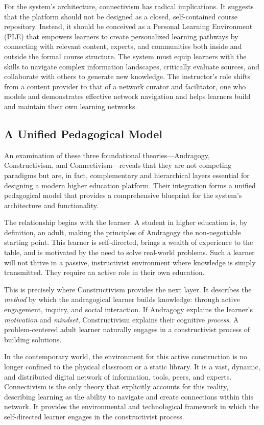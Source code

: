 \documentclass{article}
\begin{document}
For the system's architecture, connectivism has radical implications. It suggests that the platform should not be designed as a closed, self-contained course repository. Instead, it should be conceived as a Personal Learning Environment (PLE) that empowers learners to create personalized learning pathways by connecting with relevant content, experts, and communities both inside and outside the formal course structure.\cite{22} The system must equip learners with the skills to navigate complex information landscapes, critically evaluate sources, and collaborate with others to generate new knowledge.\cite{22} The instructor's role shifts from a content provider to that of a network curator and facilitator, one who models and demonstrates effective network navigation and helps learners build and maintain their own learning networks.\cite{18, 19}

\subsection{A Unified Pedagogical Model}

An examination of these three foundational theories—Andragogy, Constructivism, and Connectivism—reveals that they are not competing paradigms but are, in fact, complementary and hierarchical layers essential for designing a modern higher education platform. Their integration forms a unified pedagogical model that provides a comprehensive blueprint for the system's architecture and functionality.

The relationship begins with the learner. A student in higher education is, by definition, an adult, making the principles of Andragogy the non-negotiable starting point.\cite{7, 8} This learner is self-directed, brings a wealth of experience to the table, and is motivated by the need to solve real-world problems. Such a learner will not thrive in a passive, instructivist environment where knowledge is simply transmitted. They require an active role in their own education.

This is precisely where Constructivism provides the next layer. It describes the \textit{method} by which the andragogical learner builds knowledge: through active engagement, inquiry, and social interaction.\cite{12, 14} If Andragogy explains the learner's \textit{motivation} and \textit{mindset}, Constructivism explains their cognitive \textit{process}. A problem-centered adult learner naturally engages in a constructivist process of building solutions.

In the contemporary world, the environment for this active construction is no longer confined to the physical classroom or a static library. It is a vast, dynamic, and distributed digital network of information, tools, peers, and experts. Connectivism is the only theory that explicitly accounts for this reality, describing learning as the ability to navigate and create connections within this network.\cite{18, 21} It provides the environmental and technological framework in which the self-directed learner engages in the constructivist process.
\end{document}
